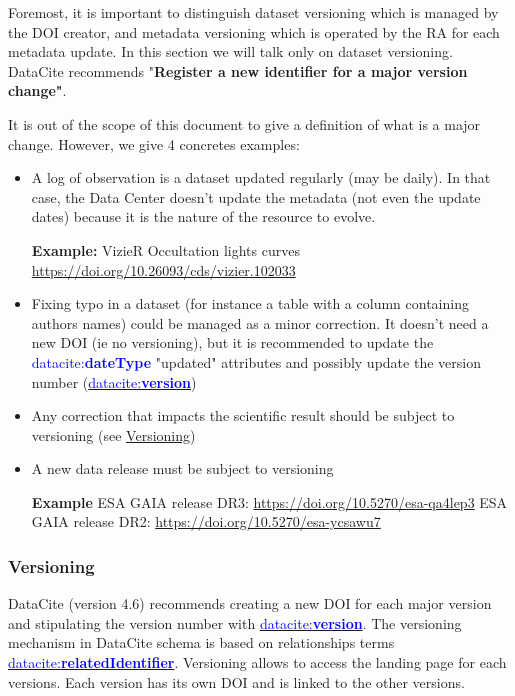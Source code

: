 \documentclass[11pt,a4paper]{ivoa}
\newcommand{\datacitedocurl}{https://datacite-metadata-schema.readthedocs.io/en/4.6}
\newcommand{\datacitepropurl}[1]{\datacitedocurl/properties/#1}
\newcommand{\dataciteterm}[1]{\textcolor{blue}{\mbox{datacite:\textbf{#1}}}}
\newcommand{\datacitetag}[2]{\href{\datacitepropurl{#1}}{\textcolor{blue}{\mbox{datacite:\textbf{#2}}}}}
\begin{document}
Foremost, it is important to distinguish dataset versioning which is managed by the DOI creator, and metadata versioning which is operated by the RA for each metadata update. In this section we will talk only on dataset versioning.\\

DataCite recommends "\textbf{Register a new identifier for a major version change"}. 

It is out of the scope of this document to give a definition of what is a major change. However, we give 4 concretes examples:

\begin{itemize}
\item{} A log of observation is a dataset updated regularly (may be daily). In that case, the Data Center doesn't update the metadata (not even the update dates) because it is the nature of the resource to evolve.

\textbf{Example:} VizieR Occultation lights curves  \newline \url{https://doi.org/10.26093/cds/vizier.102033}

\item{} Fixing typo in a dataset (for instance a table with a column containing authors names) could be managed as a minor correction. It doesn't need a new DOI (ie no versioning), but it is recommended to update the  \dataciteterm{dateType} "updated" attributes and possibly update the version number (\datacitetag{version}{version})

\item{} Any correction that impacts the scientific result should be subject to  versioning (see \hyperlink{versioning}{Versioning})

\item{} A new data release must  be subject to versioning

\textbf{Example} ESA GAIA release DR3: \url{https://doi.org/10.5270/esa-qa4lep3}\newline
ESA GAIA release DR2:
\url{https://doi.org/10.5270/esa-ycsawu7}
\end{itemize}


\subsubsection{Versioning}\hypertarget{versioning}{}\label{sec:versioning}

DataCite (version 4.6) recommends creating a new DOI for each major version and stipulating the version number with \datacitetag{version}{version}. The versioning mechanism in DataCite schema is based on relationships terms \datacitetag{relatedidentifier}{relatedIdentifier}. 
Versioning allows to access the landing page for each versions. Each version has its own DOI and is linked to the other versions.
\end{document}
